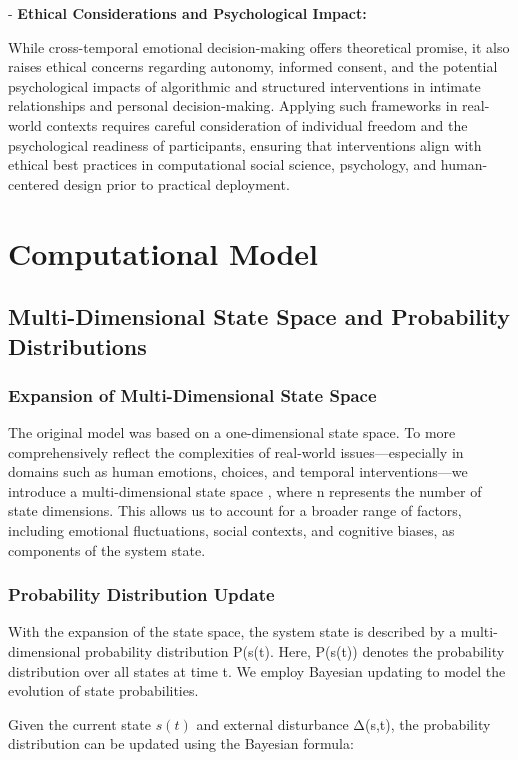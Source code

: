 \documentclass{article}
\begin{document}
- \textbf{Ethical Considerations and Psychological Impact:}

While cross-temporal emotional decision-making offers theoretical promise, it also raises ethical concerns regarding autonomy, informed consent, and the potential psychological impacts of algorithmic and structured interventions in intimate relationships and personal decision-making. Applying such frameworks in real-world contexts requires careful consideration of individual freedom and the psychological readiness of participants, ensuring that interventions align with ethical best practices in computational social science, psychology, and human-centered design prior to practical deployment.

\section{Computational Model}

\subsection{Multi-Dimensional State Space and Probability Distributions}

\subsubsection{Expansion of Multi-Dimensional State Space}

The original model was based on a one-dimensional state space. To more comprehensively reflect the complexities of real-world issues—especially in domains such as human emotions, choices, and temporal interventions—we introduce a multi-dimensional state space , where n represents the number of state dimensions. This allows us to account for a broader range of factors, including emotional fluctuations, social contexts, and cognitive biases, as components of the system state.

\subsubsection{Probability Distribution Update}

With the expansion of the state space, the system state is described by a multi-dimensional probability distribution P(s(t). Here, P(s(t)) denotes the probability distribution over all states at time t. We employ Bayesian updating to model the evolution of state probabilities.

Given the current state $s(t)$ and external disturbance Δ(s,t), the probability distribution can be updated using the Bayesian formula:
\end{document}
